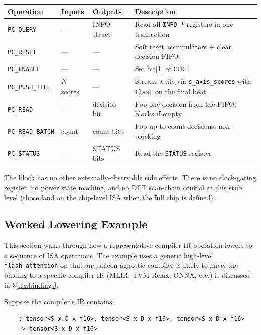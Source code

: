 \documentclass[11pt]{article}
\begin{document}
\begin{table}[h]
\centering
\small
\begin{tabular}{@{}l l l p{6cm}@{}}
\toprule
Operation                & Inputs         & Outputs        & Description \\
\midrule
\texttt{PC\_QUERY}       & ---            & INFO struct    & Read all \texttt{INFO\_*} registers in one transaction \\
\texttt{PC\_RESET}       & ---            & ---            & Soft reset accumulators + clear decision FIFO \\
\texttt{PC\_ENABLE}      & ---            & ---            & Set bit[1] of \texttt{CTRL} \\
\texttt{PC\_PUSH\_TILE}  & $N$ scores     & ---            & Stream a tile via \texttt{s\_axis\_scores} with \texttt{tlast} on the final beat \\
\texttt{PC\_READ}        & ---            & decision bit   & Pop one decision from the FIFO; blocks if empty \\
\texttt{PC\_READ\_BATCH} & count          & count bits     & Pop up to count decisions; non-blocking \\
\texttt{PC\_STATUS}      & ---            & STATUS bits    & Read the \texttt{STATUS} register \\
\bottomrule
\end{tabular}
\end{table}

\noindent
The block has no other externally-observable side effects. There is no
clock-gating register, no power state machine, and no DFT scan-chain control
at this stub level (those land on the chip-level ISA when the full chip is
defined).

\subsection{Worked Lowering Example}
\label{sec:lowering}

This section walks through how a representative compiler IR operation lowers
to a sequence of ISA operations. The example uses a generic high-level
\texttt{flash\_attention} op that any silicon-agnostic compiler is likely to
have; the binding to a specific compiler IR (MLIR, TVM Relax, ONNX, etc.) is
discussed in \S\ref{sec:bindings}.

Suppose the compiler's IR contains:
\begin{lstlisting}[basicstyle=\ttfamily\small\itshape]
%out = flash_attention(%q, %k, %v)
    : tensor<S x D x f16>, tensor<S x D x f16>, tensor<S x D x f16>
    -> tensor<S x D x f16>
\end{lstlisting}
\end{document}
